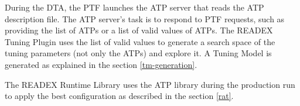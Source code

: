 During the DTA, the PTF launches the ATP server that reads the ATP description file. The ATP server's task is to respond to 
PTF requests, such as providing the list of ATPs or a list of valid values of ATPs. The READEX Tuning Plugin uses the list 
of valid values to generate a search space of the tuning parameters (not only the ATPs) and explore it. A Tuning Model is 
generated as explained in the section \ref{tm-generation}.

The READEX Runtime Library uses the ATP library during the production run to apply the best configuration as described in the 
section \ref{rat}. 




